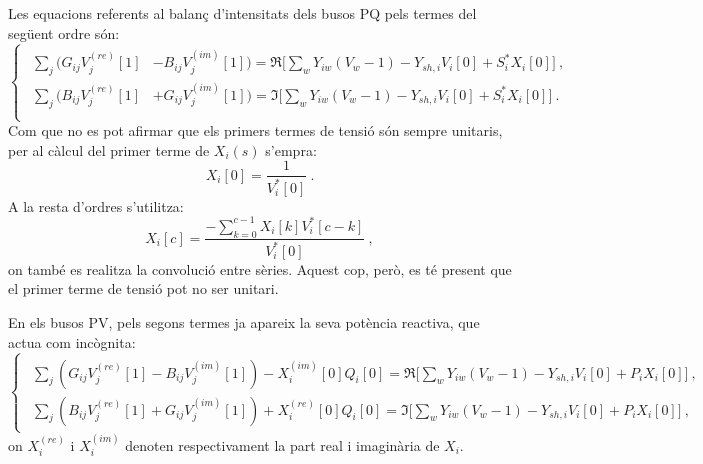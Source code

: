 Les equacions referents al balanç d'intensitats dels busos PQ pels termes del següent ordre són:
\begin{equation}
    \begin{cases}
    \begin{split}
        \sum_j(G_{ij}V^{(re)}_j[1]&-B_{ij}V^{(im)}_j[1]) = \Re\biggl[\sum_w Y_{iw}(V_w-1)-Y_{sh,i}V_i[0]+S^*_iX_i[0]\biggr]\ ,\\
        \sum_j(B_{ij}V^{(re)}_j[1]&+G_{ij}V^{(im)}_j[1]) = \Im\biggl[\sum_w Y_{iw}(V_w-1)-Y_{sh,i}V_i[0]+S^*_iX_i[0]\biggr]\ .\\
    \end{split}
\end{cases}
    \label{eq:MPQ2}
\end{equation}
Com que no es pot afirmar que els primers termes de tensió són sempre unitaris, per al càlcul del primer terme de $X_i(s)$ s'empra:
\begin{equation}
    X_i[0]=\frac{1}{V^*_i[0]}\ .
    \label{eq:Xcalcul2}
\end{equation}
A la resta d'ordres s'utilitza:
\begin{equation}
    X_i[c]=\frac{-\sum_{k=0}^{c-1}X_i[k]V^*_i[c-k]}{V^*_i[0]}\ ,
    \label{eq:Xcalcul3}
\end{equation}
on també es realitza la convolució entre sèries. Aquest cop, però, es té present que el primer terme de tensió pot no ser unitari. 

En els busos PV, pels segons termes ja apareix la seva potència reactiva, que actua com incògnita:
\begin{equation}
    \begin{cases}
    \begin{split}
        \sum_j(G_{ij}V^{(re)}_j[1]-B_{ij}V^{(im)}_j[1])-X^{(im)}_i[0]Q_i[0] = 
        \Re\biggl[\sum_w Y_{iw}(V_w-1)-Y_{sh,i}V_i[0]+P_iX_i[0]\biggr]\ ,\\
        \sum_j(B_{ij}V^{(re)}_j[1]+G_{ij}V^{(im)}_j[1])+X^{(re)}_i[0]Q_i[0] = 
        \Im\biggl[\sum_w Y_{iw}(V_w-1)-Y_{sh,i}V_i[0]+P_iX_i[0]\biggr]\ ,
    \end{split}
\end{cases}
    \label{eq:MPV3}
\end{equation}
on $X^{(re)}_i$ i $X^{(im)}_i$ denoten respectivament la part real i imaginària de $X_i$.

